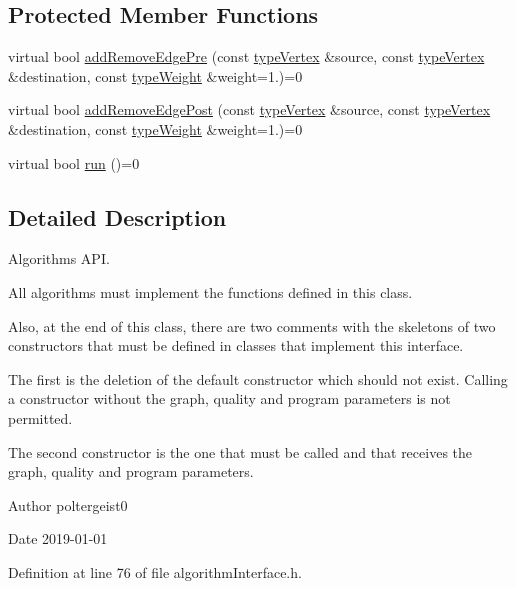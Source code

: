 \subsection*{Protected Member Functions}
\begin{DoxyCompactItemize}
\item 
virtual bool \hyperlink{classAlgorithmInterface_ae5a6e84b139768dff92a70cacaec7472}{add\+Remove\+Edge\+Pre} (const \hyperlink{edge_8h_a5fbd20c46956d479cb10afc9855223f6}{type\+Vertex} \&source, const \hyperlink{edge_8h_a5fbd20c46956d479cb10afc9855223f6}{type\+Vertex} \&destination, const \hyperlink{edge_8h_a2e7ea3be891ac8b52f749ec73fee6dd2}{type\+Weight} \&weight=1.)=0
\item 
virtual bool \hyperlink{classAlgorithmInterface_ac97ed4df4fd2b14b16d55c1b3b9749b6}{add\+Remove\+Edge\+Post} (const \hyperlink{edge_8h_a5fbd20c46956d479cb10afc9855223f6}{type\+Vertex} \&source, const \hyperlink{edge_8h_a5fbd20c46956d479cb10afc9855223f6}{type\+Vertex} \&destination, const \hyperlink{edge_8h_a2e7ea3be891ac8b52f749ec73fee6dd2}{type\+Weight} \&weight=1.)=0
\item 
virtual bool \hyperlink{classAlgorithmInterface_a0bafcdabd2b5fd45abe97af91e02ca14}{run} ()=0
\end{DoxyCompactItemize}


\subsection{Detailed Description}
Algorithms A\+PI. 

All algorithms must implement the functions defined in this class.

Also, at the end of this class, there are two comments with the skeletons of two constructors that must be defined in classes that implement this interface.

The first is the deletion of the default constructor which should not exist. Calling a constructor without the graph, quality and program parameters is not permitted.

The second constructor is the one that must be called and that receives the graph, quality and program parameters.

\begin{DoxyAuthor}{Author}
poltergeist0
\end{DoxyAuthor}
\begin{DoxyDate}{Date}
2019-\/01-\/01 
\end{DoxyDate}


Definition at line 76 of file algorithm\+Interface.\+h.



